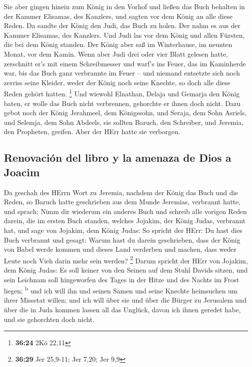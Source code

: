  Sie aber gingen hinein zum König in den Vorhof und
ließen das Buch behalten in der Kammer Elisamas, des Kanzlers, und
sagten vor dem König an alle diese Reden.  Da sandte der
König den Judi, das Buch zu holen. Der nahm es aus der Kammer Elisamas,
des Kanzlers. Und Judi las vor dem König und allen Fürsten, die bei dem
König standen.  Der König aber saß im Winterhause, im
neunten Monat, vor dem Kamin.  Wenn aber Judi drei oder
vier Blatt gelesen hatte, zerschnitt er's mit einem Schreibmesser und
warf's ins Feuer, das im Kaminherde war, bis das Buch ganz verbrannte im
Feuer --  und niemand entsetzte sich noch zerriss seine
Kleider, weder der König noch seine Knechte, so doch alle diese Reden
gehört hatten. \footnote{\textbf{36:24} 2Kö 22,11}  Und
wiewohl Elnathan, Delaja und Gemarja den König baten, er wolle das Buch
nicht verbrennen, gehorchte er ihnen doch nicht.  Dazu
gebot noch der König Jerahmeel, dem Königssohn, und Seraja, dem Sohn
Asriels, und Selemja, dem Sohn Abdeels, sie sollten Baruch, den
Schreiber, und Jeremia, den Propheten, greifen. Aber der HErr hatte sie
verborgen.

\hypertarget{renovaciuxf3n-del-libro-y-la-amenaza-de-dios-a-joacim}{%
\subsection{Renovación del libro y la amenaza de Dios a
Joacim}\label{renovaciuxf3n-del-libro-y-la-amenaza-de-dios-a-joacim}}

 Da geschah des HErrn Wort zu Jeremia, nachdem der König
das Buch und die Reden, so Baruch hatte geschrieben aus dem Munde
Jeremias, verbrannt hatte, und sprach:  Nimm dir wiederum
ein anderes Buch und schreib alle vorigen Reden darein, die im ersten
Buch standen, welches Jojakim, der König Judas, verbrannt hat,
 und sage von Jojakim, dem König Judas: So spricht der
HErr: Du hast dies Buch verbrannt und gesagt: Warum hast du darein
geschrieben, dass der König von Babel werde kommen und dieses Land
verderben und machen, dass weder Leute noch Vieh darin mehr sein werden?
\footnote{\textbf{36:29} Jer 25,9-11; Jer 7,20; Jer 9,9} 
Darum spricht der HErr von Jojakim, dem König Judas: Es soll keiner von
den Seinen auf dem Stuhl Davids sitzen, und sein Leichnam soll
hingeworfen des Tages in der Hitze und des Nachts im Frost liegen;
\textsuperscript{b}  und ich will ihn und seinen Samen
und seine Knechte heimsuchen um ihrer Missetat willen; und ich will über
sie und über die Bürger zu Jerusalem und über die in Juda kommen lassen
all das Unglück, davon ich ihnen geredet habe, und sie gehorchten doch
nicht.

